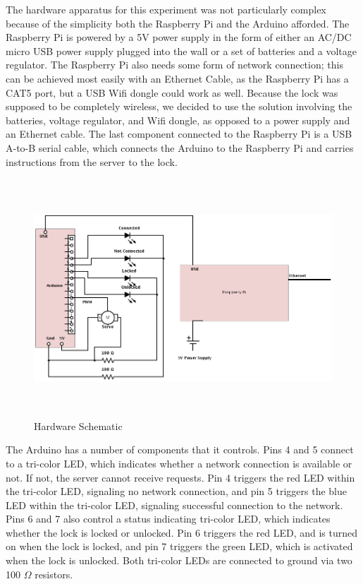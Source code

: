\documentclass[10pt]{article}
\begin{document}
\begin{multicols}{2}
The hardware apparatus for this experiment was not particularly complex because of the simplicity both the Raspberry Pi and the Arduino afforded. The Raspberry Pi is powered by a 5V power supply in the form of either an AC/DC micro USB power supply plugged into the wall or a set of batteries and a voltage regulator. The Raspberry Pi also needs some form of network connection; this can be achieved most easily with an Ethernet Cable, as the Raspberry Pi has a CAT5 port, but a USB Wifi dongle could work as well. Because the lock was supposed to be completely wireless, we decided to use the solution involving the batteries, voltage regulator, and Wifi dongle, as opposed to a power supply and an Ethernet cable. The last component connected to the Raspberry Pi is a USB A-to-B serial cable, which connects the Arduino to the Raspberry Pi and carries instructions from the server to the lock. \\

\begin{figure}[t!]
\centering
\includegraphics[height=3.5in]{circuit.png}
\caption{Hardware Schematic}
\end{figure}

The Arduino has a number of components that it controls. Pins 4 and 5 connect to a tri-color LED, which indicates whether a network connection is available or not. If not, the server cannot receive requests. Pin 4 triggers the red LED within the tri-color LED, signaling no network connection, and pin 5 triggers the blue LED within the tri-color LED, signaling successful connection to the network. Pins 6 and 7 also control a status indicating tri-color LED, which indicates whether the lock is locked or unlocked. Pin 6 triggers the red LED, and is turned on when the lock is locked, and pin 7 triggers the green LED, which is activated when the lock is unlocked. Both tri-color LEDs are connected to ground via two 100 $\Omega$ resistors. \\


\end{multicols}
\end{document}
